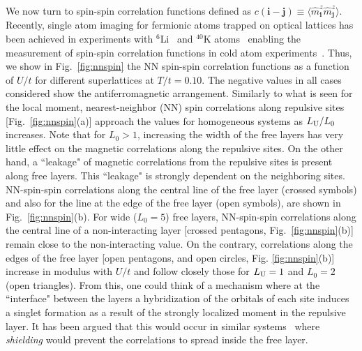 \documentclass[aps,pra,reprint,twocolumn,showpacs,longbibliography,superscriptaddress]{revtex4-1}
\begin{document}
We now turn to spin-spin correlation functions defined as $c(\mathbf{i}-\mathbf{j}) \equiv \langle \hat m_\mathbf{i}^z \hat m_\mathbf{j}^z\rangle$. Recently, single atom imaging for fermionic atoms trapped on optical lattices has been achieved in experiments with  $^6$Li~\cite{Parsons2015,Omran2015} and $^{40}$K atoms~\cite{Haller2015,Cheuk2015,Edge2015} enabling the measurement of spin-spin correlation functions in cold atom experiments~\cite{Cheuk1260,Boll2016,Parsons2016}.
Thus, we show in Fig.~\ref{fig:nnspin} the NN spin-spin correlation functions as a function of $U/t$ for different superlattices at $T/t=0.10$. 
The  negative values in all cases considered show  the antiferromagnetic arrangement. Similarly to what is seen for the local moment, nearest-neighbor (NN) spin correlations along repulsive sites [Fig.~\ref{fig:nnspin}(a)] approach the values for homogeneous systems as $L_{\rm U}/L_0$ increases. Note that for $L_0 >1$, increasing the width of the free layers has very little effect on the magnetic correlations along the repulsive sites. On the other hand, a ``leakage"  of magnetic correlations from the repulsive sites is present along free layers. This ``leakage" is strongly dependent on the neighboring sites. NN-spin-spin correlations along the central line of the free layer (crossed symbols) and also for the line at the edge of the  free layer (open symbols), are shown in Fig.~\ref{fig:nnspin}(b). For wide ($L_0=5$) free layers, NN-spin-spin correlations along  the central line of a non-interacting layer [crossed pentagons, Fig.~\ref{fig:nnspin}(b)] remain close to the non-interacting value. On the contrary,  correlations along the edges of the free layer  [open pentagons, and open circles, Fig. \ref{fig:nnspin}(b)] increase in modulus with $U/t$ and follow closely those for $L_{\rm U}=1$ and $L_0=2$ (open triangles). From this, one could think of a mechanism where at the ``interface" between the layers a hybridization of the orbitals of each site induces a singlet formation as a result of the strongly localized moment in the repulsive layer. It has been argued that this would occur in similar systems~\cite{Jiang12} where \textit{shielding} would prevent the correlations to spread inside the free layer.
\end{document}
